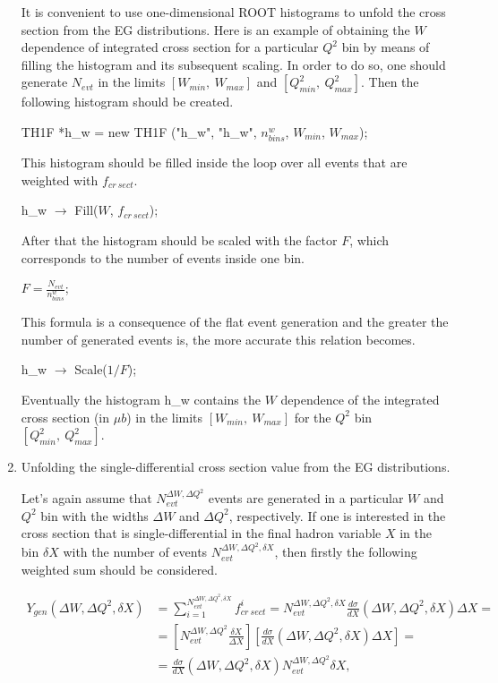 \begin{enumerate}
It is convenient to use one-dimensional ROOT histograms to unfold the cross section from the EG distributions. Here is an example of obtaining the $W$ dependence of integrated cross section for a particular $Q^2$ bin by means of filling the histogram and its subsequent scaling. In order to do so, one should generate $N_{evt}$ in the limits $[W_{min},~W_{max}]$ and $[Q^2_{min},~Q^2_{max}]$. Then the following histogram should be created.

TH1F *h\_w = new TH1F ("h\_w", "h\_w", $n_{bins}^{w}$, $W_{min}$, $W_{max}$);

This histogram should be filled inside the loop over all events that are weighted with $f_{cr~sect}$.

h\_w $\rightarrow$ Fill($W$, $f_{cr~sect}$);

After that the histogram should be scaled with the factor $F$, which corresponds to the number of events inside one bin.

$F = \frac{N_{evt}}{n_{bins}^{w}}$;

This formula is a consequence of the flat event generation and the greater the number of generated events is, the more accurate this relation becomes.

h\_w $\rightarrow$ Scale($1/F$);

Eventually the histogram h\_w contains the $W$ dependence of the integrated cross section (in $\mu b$) in the limits $[W_{min},~W_{max}]$ for the $Q^2$ bin $[Q^2_{min},~Q^2_{max}]$.

\item Unfolding the single-differential cross section value from the EG distributions.

Let's again assume that $N_{evt}^{\Delta W,\Delta Q^2}$ events are generated in a particular $W$ and $Q^2$ bin with the widths $\Delta W$ and $\Delta Q^2$, respectively. If one is interested in the cross section that is single-differential in the final hadron variable $X$ in the bin $\delta X$ with the number of events $N_{evt}^{\Delta W,\Delta Q^2, \delta X}$, then firstly the following weighted sum should be considered.


\begin{equation}
\begin{aligned}
Y_{gen}(\Delta W,\Delta Q^2,\delta X)&= \sum_{i=1}^{N_{evt}^{\Delta W,\Delta Q^2, \delta X}}f_{cr~sect}^{i} = N_{evt}^{\Delta W,\Delta Q^2, \delta X}\frac{d\sigma}{dX} (\Delta W,\Delta Q^2,\delta X)\Delta X = \\
&= \left [ N_{evt}^{\Delta W,\Delta Q^2 }\frac{\delta X}{\Delta X}\right ] \left [\frac{d\sigma}{dX} (\Delta W,\Delta Q^2,\delta X)\Delta X\right ] = \\
&= \frac{d\sigma}{dX} (\Delta W,\Delta Q^2,\delta X)N_{evt}^{\Delta W,\Delta Q^2}\delta X, 
\label{eq:first_case}
\end{aligned}
\end{equation}



\end{enumerate}
